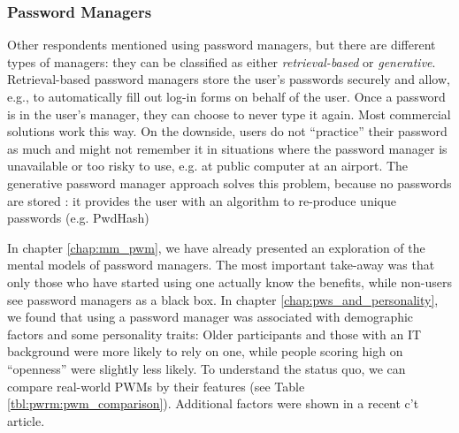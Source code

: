 \subsubsection{Password Managers} 
Other respondents mentioned using password managers, but there are different types of managers: they can be classified as either \textit{retrieval-based} or \textit{generative}. Retrieval-based password managers store the user's passwords securely and allow, e.g., to automatically fill out log-in forms on behalf of the user. Once a password is in the user's manager, they can choose to never type it again. Most commercial solutions work this way. On the downside, users do not ``practice'' their password as much and might not remember it in situations where the password manager is unavailable or too risky to use, e.g. at public computer at an airport. The generative password manager approach solves this problem, because no passwords are stored \cite{McCarney2012Tapas}: it provides the user with an algorithm to re-produce unique passwords (e.g. PwdHash)  %

%
%


In chapter \ref{chap:mm_pwm}, we have already presented an exploration of the mental models of password managers. The most important take-away was that only those who have started using one actually know the benefits, while non-users see password managers as a black box. In chapter \ref{chap:pws_and_personality}, we found that using a password manager was associated with demographic factors and some personality traits: Older participants and those with an IT background were more likely to rely on one, while people scoring high on ``openness'' were slightly less likely. To understand the status quo, we can compare real-world PWMs by their features (see Table \ref{tbl:pwrm:pwm_comparison}). Additional factors were shown in a recent c't article. 


